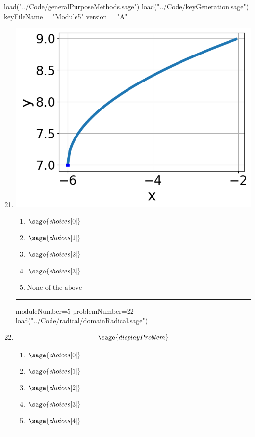 \documentclass[14pt]{article}
\newcommand{\litem}[1]{\item#1\hspace*{-1cm}\rule{\textwidth}{0.4pt}}
\begin{document}
\pagestyle{fancy}

\begin{sagesilent}
load("../Code/generalPurposeMethods.sage")
load("../Code/keyGeneration.sage")
keyFileName = "Module5"
version = "A"
\end{sagesilent}

\begin{enumerate}
\setcounter{enumi}{20}


\begin{sagesilent}
moduleNumber=5
problemNumber=21
load("../Code/radical/radicalGraphToEquation.sage")
\end{sagesilent}

\litem{
\begin{multicols}{2}
\begin{center}
\includegraphics[width=.3\textwidth]{../Figures/radicalGraphToEquationA.png}
\end{center}

\columnbreak

	\begin{enumerate}[label=\Alph*.]
		\item \( \sage{choices[0]} \)
		\item \( \sage{choices[1]} \)
		\item \( \sage{choices[2]} \)
		\item \( \sage{choices[3]} \)
    \item \( \text{None of the above} \)
	\end{enumerate}
\end{multicols}
}

\begin{sagesilent}
moduleNumber=5
problemNumber=22
load("../Code/radical/domainRadical.sage")
\end{sagesilent}

\litem{ 

	\[ \sage{displayProblem} \]
	\begin{enumerate}[label=\Alph*.]
		\item \( \sage{choices[0]} \)
		\item \( \sage{choices[1]} \)
		\item \( \sage{choices[2]} \)
		\item \( \sage{choices[3]} \)
		\item \( \sage{choices[4]} \)
	\end{enumerate}
}


\end{enumerate}
\end{document}
